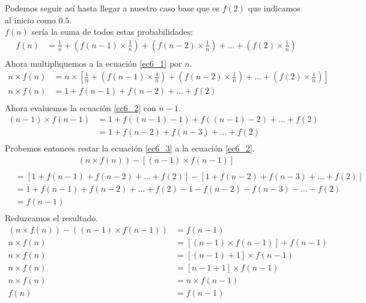 \documentclass[12pt]{article}
\begin{document}
Podemos seguir así hasta llegar a nuestro caso base que es $f(2)$ que indicamos al inicio como $0.5$.\\
$f(n)$ sería la suma de todos estas probabilidades:
\begin{equation}\label{ec6_1}
	\begin{split}
	f(n)&= \frac{1}{n} + (f(n-1)\times\frac{1}{n}) + (f(n-2)\times\frac{1}{n})+\dots+ (f(2)\times\frac{1}{n})\\
	\end{split}
\end{equation}
Ahora multipliquemos a la ecuación \ref{ec6_1} por $n$.\\
\begin{equation}\label{ec6_2}
\begin{split}
n \times f(n)&= n\times [\frac{1}{n} + (f(n-1)\times\frac{1}{n}) + (f(n-2)\times\frac{1}{n})+\dots+ (f(2)\times\frac{1}{n})]\\
n \times f(n)&= 1 + f(n-1) + f(n-2)+\dots+ f(2)\\
\end{split}
\end{equation}
Ahora evaluemos la ecuación \ref{ec6_2} con $n-1$.
\begin{equation}\label{ec6_3}
\begin{split}
(n-1) \times f(n-1)&= 1 + f((n-1)-1) + f((n-1)-2)+\dots+ f(2)\\
&= 1 + f(n-2) + f(n-3)+\dots+ f(2)\\
\end{split}
\end{equation}
Probemos entonces restar la ecuación \ref{ec6_3} a la ecuación \ref{ec6_2}.
\begin{equation}\label{ec6_4}
\begin{split}
(n\times f(n)) - [(n-1) \times f(n-1)]  \\
\end{split}
\end{equation}
\begin{equation}
\begin{split}
&= [1 + f(n-1) + f(n-2)+\dots+ f(2)] - [1 + f(n-2) + f(n-3)+\dots+ f(2)]\\
&= 1 + f(n-1) + f(n-2)+\dots+ f(2) - 1 - f(n-2) - f(n-3)-\dots- f(2)\\
&= f(n-1)\\
\end{split}
\end{equation}
Reduzcamos el resultado.\\
\begin{equation}
\begin{split}
(n\times f(n)) - ((n-1) \times f(n-1)) & = f(n-1)\\
n\times f(n) &= [(n-1) \times f(n-1)] + f(n-1)\\
n\times f(n) &= [(n-1) + 1] \times f(n-1)\\
n\times f(n) &= [n - 1 + 1] \times f(n-1)\\
n\times f(n) &= n \times f(n-1)\\
f(n) &= f(n-1)\\
\end{split}
\end{equation}
\end{document}
